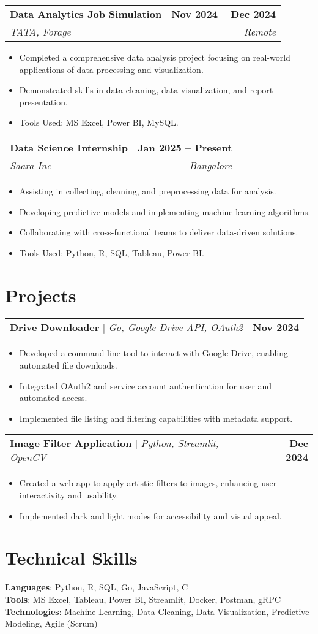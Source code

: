 \documentclass[letterpaper,11pt]{article}
\makeatletter
\newcommand{\resumeItem}[1]{
  \item\small{
    {#1 \vspace{-2pt}}
  }
}
\newcommand{\resumeSubheading}[4]{
  \vspace{-2pt}\item
    \begin{tabular*}{1.0\textwidth}[t]{l@{\extracolsep{\fill}}r}
      \textbf{#1} & \textbf{\small #2} \\
      \textit{\small#3} & \textit{\small #4} \\
    \end{tabular*}\vspace{-7pt}
}
\newcommand{\resumeProjectHeading}[2]{
    \item
    \begin{tabular*}{1.001\textwidth}{l@{\extracolsep{\fill}}r}
      \small#1 & \textbf{\small #2}\\
    \end{tabular*}\vspace{-7pt}
}
\newcommand{\resumeItemListStart}{\begin{itemize}}
\newcommand{\resumeItemListEnd}{\end{itemize}\vspace{-5pt}}
\makeatother
\begin{document}
    \resumeSubheading
      {Data Analytics Job Simulation}{Nov 2024 -- Dec 2024}
      {TATA, Forage}{Remote}
      \resumeItemListStart
        \resumeItem{Completed a comprehensive data analysis project focusing on real-world applications of data processing and visualization.}
        \resumeItem{Demonstrated skills in data cleaning, data visualization, and report presentation.}
        \resumeItem{Tools Used: MS Excel, Power BI, MySQL.}
      \resumeItemListEnd

    \resumeSubheading
      {Data Science Internship}{Jan 2025 -- Present}
      {Saara Inc}{Bangalore}
      \resumeItemListStart
        \resumeItem{Assisting in collecting, cleaning, and preprocessing data for analysis.}
        \resumeItem{Developing predictive models and implementing machine learning algorithms.}
        \resumeItem{Collaborating with cross-functional teams to deliver data-driven solutions.}
        \resumeItem{Tools Used: Python, R, SQL, Tableau, Power BI.}
      \resumeItemListEnd

  \resumeSubHeadingListEnd

\section{Projects}
    \resumeSubHeadingListStart
     \resumeProjectHeading
          {\textbf{Drive Downloader} $|$ \emph{Go, Google Drive API, OAuth2}}{Nov 2024}
          \resumeItemListStart
            \resumeItem{Developed a command-line tool to interact with Google Drive, enabling automated file downloads.}
            \resumeItem{Integrated OAuth2 and service account authentication for user and automated access.}
            \resumeItem{Implemented file listing and filtering capabilities with metadata support.}
          \resumeItemListEnd

      \resumeProjectHeading
          {\textbf{Image Filter Application} $|$ \emph{Python, Streamlit, OpenCV}}{Dec 2024}
          \resumeItemListStart
            \resumeItem{Created a web app to apply artistic filters to images, enhancing user interactivity and usability.}
            \resumeItem{Implemented dark and light modes for accessibility and visual appeal.}
          \resumeItemListEnd
    \resumeSubHeadingListEnd

\section{Technical Skills}
 \begin{itemize}[leftmargin=0.15in, label={}]
    \small{\item{
     \textbf{Languages}{: Python, R, SQL, Go, JavaScript, C} \\
     \textbf{Tools}{: MS Excel, Tableau, Power BI, Streamlit, Docker, Postman, gRPC} \\
     \textbf{Technologies}{: Machine Learning, Data Cleaning, Data Visualization, Predictive Modeling, Agile (Scrum)} \\
    }}
 \end{itemize}
\end{document}
